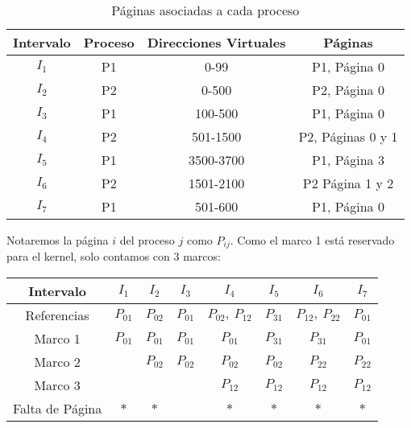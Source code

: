\begin{ejercicio}
\begin{enumerate}
        \begin{table}[h]
            \centering
            \begin{tabular}{|c|c|c|c|}
                \hline
                Intervalo & Proceso & Direcciones Virtuales & Páginas \\
                \hline
                $I_1$& P1 & 0-99 & P1, Página 0 \\
                $I_2$&P2 & 0-500 & P2, Página 0\\
                $I_3$&P1 & 100-500 & P1, Página 0\\
                $I_4$&P2 & 501-1500 & P2, Páginas 0 y 1\\
                $I_5$&P1 & 3500-3700 & P1, Página 3\\
                $I_6$&P2 & 1501-2100 & P2 Página 1 y 2 \\
                $I_7$&P1 & 501-600 & P1, Página 0\\
                \hline
            \end{tabular}
            \caption{Páginas asociadas a cada proceso}
        \end{table}

        Notaremos la página $i$ del proceso $j$ como $P_{ij}$. Como el
        marco 1 está reservado para el kernel, solo contamos con 3 marcos:
        \begin{table}[H]
            \centering
            \begin{tabular}{|c|c|c|c|c|c|c|c|}
            Intervalo       & $I_1$    & $I_2$    & $I_3$    & $I_4$            & $I_5$    & $I_6$            & $I_7$    \\ \hline 
            Referencias     & $P_{01}$ & $P_{02}$ & $P_{01}$ & $P_{02},~P_{12}$ & $P_{31}$ & $P_{12},~P_{22}$ & $P_{01}$ \\ \hline \hline
            Marco 1         & $P_{01}$ & $P_{01}$ & $P_{01}$ & $P_{01}$         & $P_{31}$ & $P_{31}$         & $P_{01}$ \\ \hline
            Marco 2         &          & $P_{02}$ & $P_{02}$ & $P_{02}$         & $P_{02}$ & $P_{22}$         & $P_{22}$ \\ \hline
            Marco 3         &          &          &          & $P_{12}$         & $P_{12}$ & $P_{12}$         & $P_{12}$ \\ \hline \hline
            Falta de Página & $\ast$        & $\ast$        &          & $\ast$                & $\ast$        & $\ast$                & $\ast$
            \end{tabular}
            \end{table}
    \end{enumerate}
\end{ejercicio}


